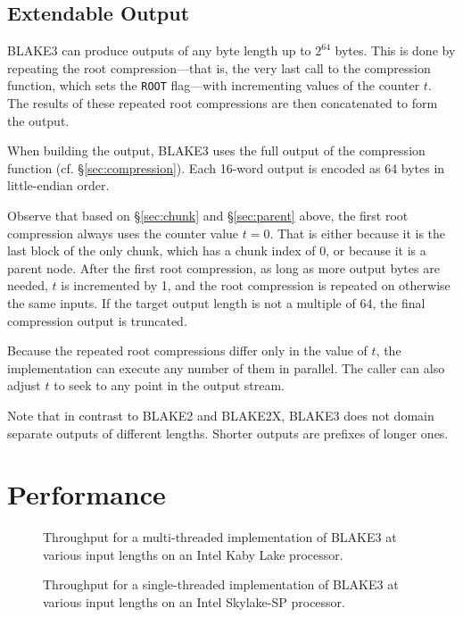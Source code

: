 \documentclass[11pt,notitlepage,a4paper]{article}
\begin{document}
\subsection{Extendable Output}\label{sec:extendable}

BLAKE3 can produce outputs of any byte length up to $2^{64}$ bytes. 
This is done by repeating the root compression---that is, the very last 
call to the compression function, which sets the \texttt{ROOT} flag---with 
incrementing values of the counter $t$. The results of these repeated root 
compressions are then concatenated to form the output.

When building the output, BLAKE3 uses the full output of the
compression function (cf. \S\ref{sec:compression}). Each 16-word output is
encoded as 64 bytes in little-endian order.

Observe that based on \S\ref{sec:chunk} and \S\ref{sec:parent} above, the first
root compression always uses the counter value $t = 0$. That is either because
it is the last block of the only chunk, which has a chunk index of $0$, or
because it is a parent node. After the first root compression, as long as more
output bytes are needed, $t$ is incremented by 1, and the root compression is
repeated on otherwise the same inputs. If the target output length is not a
multiple of 64, the final compression output is truncated.

Because the repeated root compressions differ only in the value of $t$, the
implementation can execute any number of them in parallel. The caller can also
adjust $t$ to seek to any point in the output stream.

Note that in contrast to BLAKE2 and BLAKE2X, BLAKE3 does not domain separate
outputs of different lengths. Shorter outputs are prefixes of longer ones.

\section{Performance}\label{sec:performance}

\begin{figure}[h]
\centering
%

\caption{Throughput for a multi-threaded implementation of BLAKE3 at various
    input lengths on an Intel Kaby Lake processor.}
\label{fig:avx2_rayon}
\end{figure}

\begin{figure}[h]
\centering
%

\caption{Throughput for a single-threaded implementation of BLAKE3 at various
    input lengths on an Intel Skylake-SP processor.}%
\label{fig:avx512_c}
\end{figure}
\end{document}
